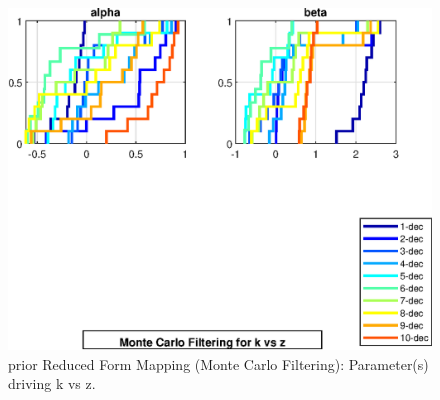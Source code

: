 
\begin{figure}[H]
\centering 
\includegraphics[width=1.00\textwidth]{RBC_kz/gsa/redform_prior/k_vs_z_threshold/RBC_kz_prior_k_vs_z_threshold}
\caption{prior Reduced Form Mapping (Monte Carlo Filtering): Parameter(s) driving k vs z.}\label{Fig:RBC_kz_prior_k_vs_z_threshold}
\end{figure}

